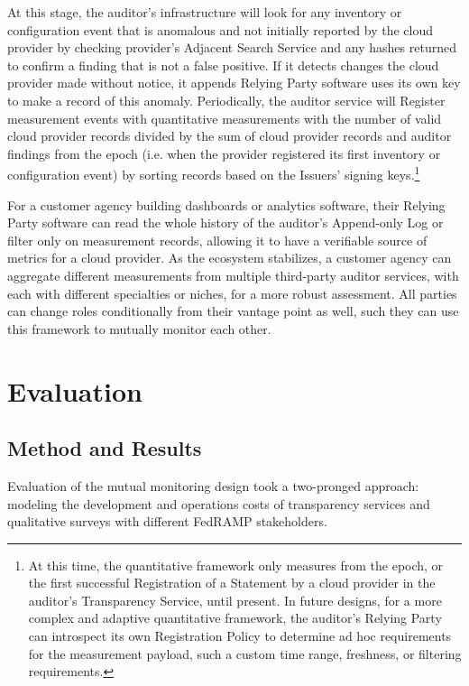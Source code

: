\documentclass{jdf}
\begin{document}
At this stage, the auditor's infrastructure will look for any inventory or configuration event that is anomalous and not initially reported by the cloud provider by checking provider's Adjacent Search Service and any hashes returned to confirm a finding that is not a false positive. If it detects changes the cloud provider made without notice, it appends Relying Party software uses its own key to make a record of this anomaly. Periodically, the auditor service will Register measurement events with quantitative measurements with the number of valid cloud provider records divided by the sum of cloud provider records and auditor findings from the epoch (i.e. when the provider registered its first inventory or configuration event) by sorting records based on the Issuers' signing keys.\footnote{At this time, the quantitative framework only measures from the epoch, or the first successful Registration of a Statement by a cloud provider in the auditor's Transparency Service, until present. In future designs, for a more complex and adaptive quantitative framework, the auditor's Relying Party can introspect its own Registration Policy to determine ad hoc requirements for the measurement payload, such a custom time range, freshness, or filtering requirements.}

For a customer agency building dashboards or analytics software, their Relying Party software can read the whole history of the auditor's Append-only Log or filter only on measurement records, allowing it to have a verifiable source of metrics for a cloud provider. As the ecosystem stabilizes, a customer agency can aggregate different measurements from multiple third-party auditor services, with each with different specialties or niches, for a more robust assessment. All parties can change roles conditionally from their vantage point as well, such they can use this framework to mutually monitor each other.

\section{Evaluation}

\subsection{Method and Results}

Evaluation of the mutual monitoring design took a two-pronged approach: modeling the development and operations costs of transparency services and qualitative surveys with different FedRAMP stakeholders.
\end{document}
